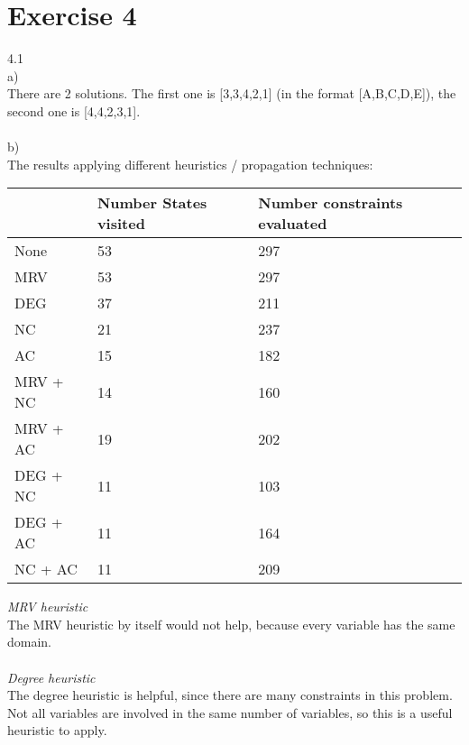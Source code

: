 \documentclass{article}
\begin{document}
\section*{Exercise 4}
4.1
\\
a)
\\
There are 2 solutions. The first one is [3,3,4,2,1] (in the format [A,B,C,D,E]), the second one is [4,4,2,3,1].\\
\\
b)
\\
The results applying different heuristics / propagation techniques:
\begin{center}
\begin{tabular}{|l|l|l|}
\hline
         & Number States visited & Number constraints evaluated \\ \hline
None     & 53                    & 297                          \\ \hline
MRV      & 53                    & 297                          \\ \hline
DEG      & 37                    & 211                          \\ \hline
NC       & 21                    & 237                          \\ \hline
AC       & 15                    & 182                          \\ \hline
MRV + NC & 14                    & 160                          \\ \hline
MRV + AC & 19                    & 202                          \\ \hline
DEG + NC & 11                    & 103                          \\ \hline
DEG + AC & 11                    & 164                          \\ \hline
NC + AC  & 11                    & 209                          \\ \hline
\end{tabular}
\end{center}
\textit{MRV heuristic}\\
The MRV heuristic by itself would not help, because every variable has the same domain.\\
\\
\textit{Degree heuristic}\\
The degree heuristic is helpful, since there are many constraints in this problem. Not all variables are involved in the same number of variables, so this is a useful heuristic to apply.\\
\end{document}
